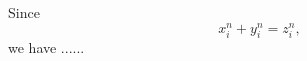 \documentclass{article}
\begin{document}
Since
\begin{displaymath}
x_i^n+y_i^n=z_i^n,
\end{displaymath}
we have ......
\end{document}
